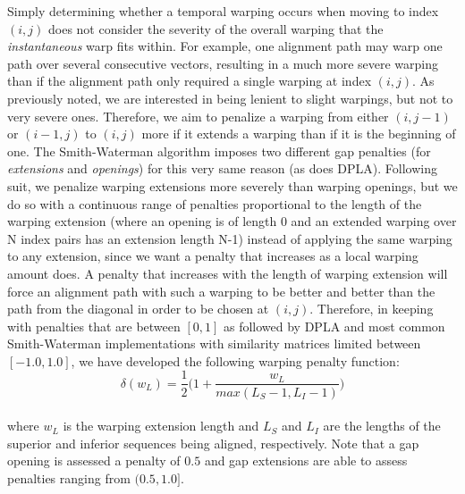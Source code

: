 \documentclass[a4paper,12pt]{report} 	%
\numberwithin{figure}{chapter}
\numberwithin{table}{chapter}
\numberwithin{equation}{chapter}
\begin{document}
\begin{flushleft}
Simply determining whether a temporal warping occurs when moving to index $(i,j)$ does not consider the severity of the overall warping that the \emph{instantaneous} warp fits within. For example, one alignment path may warp one path over several consecutive vectors, resulting in a much more severe warping than if the alignment path only required a single warping at index $(i,j)$. As previously noted, we are interested in being lenient to slight warpings, but not to very severe ones. Therefore, we aim to penalize a warping from either $(i,j-1)$ or $(i-1,j)$ to $(i,j)$ more if it extends a warping than if it is the beginning of one. The Smith-Waterman algorithm imposes two different gap penalties (for \emph{extensions} and \emph{openings}) for this very same reason (as does DPLA). Following suit, we penalize warping extensions more severely than warping openings, but we do so with a continuous range of penalties proportional to the length of the warping extension (where an opening is of length 0 and an extended warping over N index pairs has an extension length N-1) instead of applying the same warping to any extension, since we want a penalty that increases as a local warping amount does. A penalty that increases with the length of warping extension will force an alignment path with such a warping to be better and better than the path from the diagonal in order to be chosen at $(i,j)$. Therefore, in keeping with penalties that are between $[0,1]$ as followed by DPLA and most common Smith-Waterman implementations with similarity matrices limited between $[-1.0,1.0]$, we have developed the following warping penalty function:
\begin{equation}
\delta(w_L) = \frac{1}{2}\bigg(1 + \frac{w_L}{max(L_S - 1,L_I - 1)}\bigg)
\end{equation}
\\
\vspace{10 mm}
\noindent where $w_L$ is the warping extension length and $L_S$ and $L_I$ are the lengths of the superior and inferior sequences being aligned, respectively. Note that a gap opening is assessed a penalty of $0.5$ and gap extensions are able to assess penalties ranging from $(0.5,1.0]$.


\end{flushleft}
\end{document}
